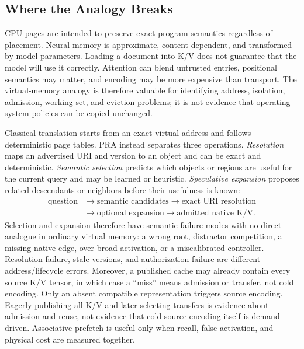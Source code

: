 \documentclass[11pt]{article}
\begin{document}
\subsection{Where the Analogy Breaks}

CPU pages are intended to preserve exact program semantics regardless of placement. Neural memory is approximate, content-dependent, and transformed by model parameters. Loading a document into K/V does not guarantee that the model will use it correctly. Attention can blend untrusted entries, positional semantics may matter, and encoding may be more expensive than transport. The virtual-memory analogy is therefore valuable for identifying address, isolation, admission, working-set, and eviction problems; it is not evidence that operating-system policies can be copied unchanged.

Classical translation starts from an exact virtual address and follows deterministic page tables.
PRA instead separates three operations. \emph{Resolution} maps an advertised URI and version
to an object and can be exact and deterministic. \emph{Semantic selection} predicts which
objects or regions are useful for the current query and may be learned or heuristic.
\emph{Speculative expansion} proposes related descendants or neighbors before their usefulness
is known:
\begin{equation}
\begin{aligned}
\text{question} &\rightarrow \text{semantic candidates}
\rightarrow \text{exact URI resolution} \\
&\rightarrow \text{optional expansion}
\rightarrow \text{admitted native K/V}.
\end{aligned}
\end{equation}
Selection and expansion therefore have semantic failure modes with no direct analogue in
ordinary virtual memory: a wrong root, distractor competition, a missing native edge,
over-broad activation, or a miscalibrated controller. Resolution failure, stale versions, and
authorization failure are different address/lifecycle errors. Moreover, a published cache may
already contain every source K/V tensor, in which case a ``miss'' means admission or transfer,
not cold encoding. Only an absent compatible representation triggers source encoding. Eagerly
publishing all K/V and later selecting transfers is evidence about admission and reuse, not
evidence that cold source encoding itself is demand driven. Associative prefetch is useful only
when recall, false activation, and physical cost are measured together.
\end{document}
